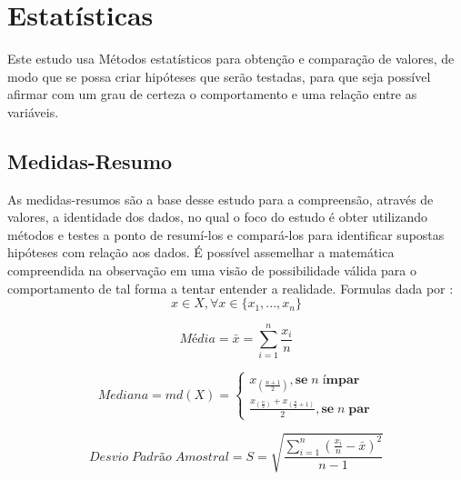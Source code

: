 

\chapter{Estatísticas}
Este estudo usa Métodos estatísticos para obtenção e comparação de valores,
de modo que se possa criar hipóteses que serão testadas, para que seja possível
afirmar com um grau de certeza o comportamento e uma relação entre as variáveis.

\section{Medidas-Resumo}
As medidas-resumos são a base desse estudo para a compreensão, através de valores,
a identidade dos dados, no qual o foco do estudo é obter utilizando métodos e testes
a ponto de resumí-los e compará-los para identificar supostas hipóteses com relação aos dados.
É possível assemelhar a matemática compreendida na observação em uma visão de possibilidade
válida para o comportamento de tal forma a tentar entender a realidade. Formulas dada por 
{}:
$$x \in X,\forall x \in \{x_1,...,x_n\}$$

\begin{equation}
    Média = \bar{x} = \sum_{i=1}^{n} \frac{x_i}{n}
\end{equation}

\begin{equation}
Mediana = md(X) =\left \{\begin{array}{lll}x_{(\frac{n+1}{2})}, \textbf{se} \; n \; \textbf{ímpar}\\\frac{x_{(\frac{n}{2})} + x_{(\frac{n}{2}+1)}}{2}, \textbf{se} \; n \; \textbf{par}\end{array} \right.
\end{equation}

\begin{equation}
Desvio \; Padrão \; Amostral = S = \sqrt{\frac{\sum_{i=1}^{n} (\frac{x_i}{n} - \bar{x})^2}{n-1}}
\end{equation}


